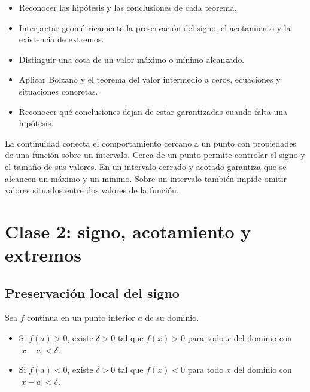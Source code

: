 \documentclass[10pt,a5paper]{article}
\begin{document}

\begin{objetivos}
\begin{itemize}
  \item Reconocer las hipótesis y las conclusiones de cada teorema.
  \item Interpretar geométricamente la preservación del signo, el acotamiento y la existencia de extremos.
  \item Distinguir una cota de un valor máximo o mínimo alcanzado.
  \item Aplicar Bolzano y el teorema del valor intermedio a ceros, ecuaciones y situaciones concretas.
  \item Reconocer qué conclusiones dejan de estar garantizadas cuando falta una hipótesis.
\end{itemize}
\end{objetivos}

\begin{resumen}
La continuidad conecta el comportamiento cercano a un punto con propiedades de una función sobre un intervalo. Cerca de un punto permite controlar el signo y el tamaño de sus valores. En un intervalo cerrado y acotado garantiza que se alcancen un máximo y un mínimo. Sobre un intervalo también impide omitir valores situados entre dos valores de la función.
\end{resumen}

\section*{Clase 2: signo, acotamiento y extremos}
\subsection*{Preservación local del signo}

\begin{teorema}
Sea $f$ continua en un punto interior $a$ de su dominio.
\begin{itemize}
  \item Si $f(a)>0$, existe $\delta>0$ tal que $f(x)>0$ para todo $x$ del dominio con $|x-a|<\delta$.
  \item Si $f(a)<0$, existe $\delta>0$ tal que $f(x)<0$ para todo $x$ del dominio con $|x-a|<\delta$.
\end{itemize}
\end{teorema}
\end{document}
